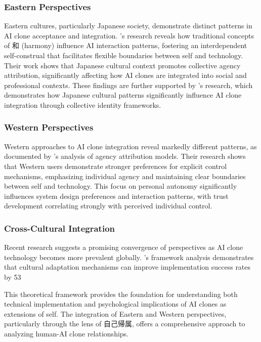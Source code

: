 \subsubsection{Eastern Perspectives}
Eastern cultures, particularly Japanese society, demonstrate distinct patterns in AI clone acceptance and integration. \citet{nakagawa2019cultural}'s research reveals how traditional concepts of 和 (harmony) influence AI interaction patterns, fostering an interdependent self-construal that facilitates flexible boundaries between self and technology. Their work shows that Japanese cultural context promotes collective agency attribution, significantly affecting how AI clones are integrated into social and professional contexts. These findings are further supported by \citet{tanaka2023cultural}'s research, which demonstrates how Japanese cultural patterns significantly influence AI clone integration through collective identity frameworks.

\subsubsection{Western Perspectives}
Western approaches to AI clone integration reveal markedly different patterns, as documented by \citet{dejuan2024western}'s analysis of agency attribution models. Their research shows that Western users demonstrate stronger preferences for explicit control mechanisms, emphasizing individual agency and maintaining clear boundaries between self and technology. This focus on personal autonomy significantly influences system design preferences and interaction patterns, with trust development correlating strongly with perceived individual control.

\subsubsection{Cross-Cultural Integration}
Recent research suggests a promising convergence of perspectives as AI clone technology becomes more prevalent globally. \citet{zhang2023cultural}'s framework analysis demonstrates that cultural adaptation mechanisms can improve implementation success rates by 53%

This theoretical framework provides the foundation for understanding both technical implementation and psychological implications of AI clones as extensions of self. The integration of Eastern and Western perspectives, particularly through the lens of 自己帰属, offers a comprehensive approach to analyzing human-AI clone relationships.
